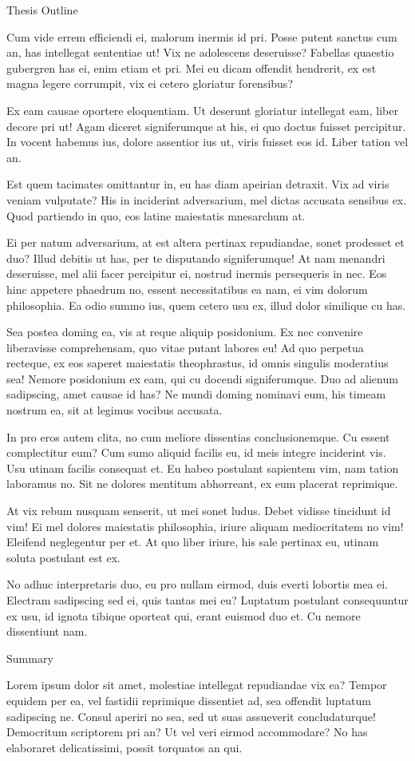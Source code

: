 \begin{introduction}
\begin{section}{Thesis Outline}
{Cum vide errem efficiendi ei, malorum inermis id pri. Posse putent sanctus cum an, has intellegat sententiae ut! Vix ne adolescens deseruisse? Fabellas quaestio gubergren has ei, enim etiam et pri. Mei eu dicam offendit hendrerit, ex est magna legere corrumpit, vix ei cetero gloriatur forensibus?

Ex eam causae oportere eloquentiam. Ut deserunt gloriatur intellegat eam, liber decore pri ut! Agam diceret signiferumque at his, ei quo doctus fuisset percipitur. In vocent habemus ius, dolore assentior ius ut, viris fuisset eos id. Liber tation vel an.

Est quem tacimates omittantur in, eu has diam apeirian detraxit. Vix ad viris veniam vulputate? His in inciderint adversarium, mel dictas accusata sensibus ex. Quod partiendo in quo, eos latine maiestatis mnesarchum at.

Ei per natum adversarium, at est altera pertinax repudiandae, sonet prodesset et duo? Illud debitis ut has, per te disputando signiferumque! At nam menandri deseruisse, mel alii facer percipitur ei, nostrud inermis persequeris in nec. Eos hinc appetere phaedrum no, essent necessitatibus ea nam, ei vim dolorum philosophia. Ea odio summo ius, quem cetero usu ex, illud dolor similique cu has.

Sea postea doming ea, vis at reque aliquip posidonium. Ex nec convenire liberavisse comprehensam, quo vitae putant labores eu! Ad quo perpetua recteque, ex eos saperet maiestatis theophrastus, id omnis singulis moderatius sea! Nemore posidonium ex eam, qui cu docendi signiferumque. Duo ad alienum sadipscing, amet causae id has? Ne mundi doming nominavi eum, his timeam nostrum ea, sit at legimus vocibus accusata.

In pro eros autem clita, no cum meliore dissentias conclusionemque. Cu essent complectitur eum? Cum sumo aliquid facilis eu, id meis integre inciderint vis. Usu utinam facilis consequat et. Eu habeo postulant sapientem vim, nam tation laboramus no. Sit ne dolores mentitum abhorreant, ex eum placerat reprimique.

At vix rebum nusquam senserit, ut mei sonet ludus. Debet vidisse tincidunt id vim! Ei mel dolores maiestatis philosophia, iriure aliquam mediocritatem no vim! Eleifend neglegentur per et. At quo liber iriure, his sale pertinax eu, utinam soluta postulant est ex.

No adhuc interpretaris duo, eu pro nullam eirmod, duis everti lobortis mea ei. Electram sadipscing sed ei, quis tantas mei eu? Luptatum postulant consequuntur ex usu, id ignota tibique oporteat qui, erant euismod duo et. Cu nemore dissentiunt nam.
}
\end{section}
\begin{section}{Summary}
{
    Lorem ipsum dolor sit amet, molestiae intellegat repudiandae vix ea? Tempor equidem per ea, vel fastidii reprimique dissentiet ad, sea offendit luptatum sadipscing ne. Consul aperiri no sea, sed ut suas assueverit concludaturque! Democritum scriptorem pri an? Ut vel veri eirmod accommodare? No has elaboraret delicatissimi, possit torquatos an qui.

}
\end{section}
\end{introduction}

